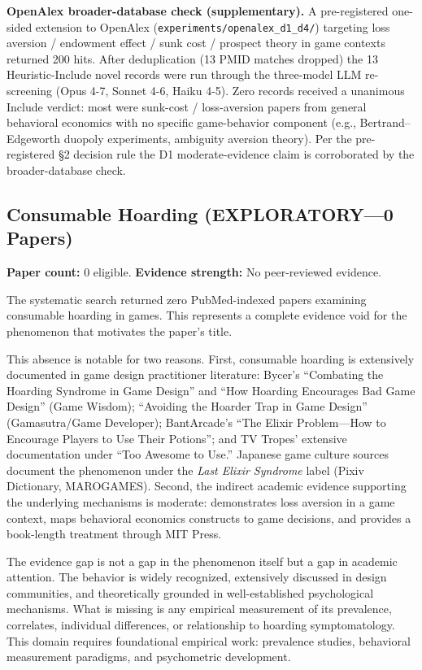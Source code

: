 \documentclass[12pt]{article}
\begin{document}
\textbf{OpenAlex broader-database check (supplementary).} A pre-registered one-sided extension to OpenAlex (\texttt{experiments/openalex\_d1\_d4/}) targeting loss aversion / endowment effect / sunk cost / prospect theory in game contexts returned 200 hits. After deduplication (13 PMID matches dropped) the 13 Heuristic-Include novel records were run through the three-model LLM re-screening (Opus 4-7, Sonnet 4-6, Haiku 4-5). Zero records received a unanimous Include verdict: most were sunk-cost / loss-aversion papers from general behavioral economics with no specific game-behavior component (e.g., Bertrand–Edgeworth duopoly experiments, ambiguity aversion theory). Per the pre-registered §2 decision rule the D1 moderate-evidence claim is corroborated by the broader-database check.

\subsection{Consumable Hoarding (EXPLORATORY---0 Papers)}

\textbf{Paper count:} 0 eligible. \textbf{Evidence strength:} No peer-reviewed evidence.

The systematic search returned zero PubMed-indexed papers examining consumable hoarding in games. This represents a complete evidence void for the phenomenon that motivates the paper's title.

This absence is notable for two reasons. First, consumable hoarding is extensively documented in game design practitioner literature: Bycer's ``Combating the Hoarding Syndrome in Game Design'' and ``How Hoarding Encourages Bad Game Design'' (Game Wisdom); ``Avoiding the Hoarder Trap in Game Design'' (Gamasutra/Game Developer); BantArcade's ``The Elixir Problem---How to Encourage Players to Use Their Potions''; and TV Tropes' extensive documentation under ``Too Awesome to Use.'' Japanese game culture sources document the phenomenon under the \textit{Last Elixir Syndrome} label (Pixiv Dictionary, MAROGAMES). Second, the indirect academic evidence supporting the underlying mechanisms is moderate: \citet{Phillips2020} demonstrates loss aversion in a game context, \citet{Toh2021} maps behavioral economics constructs to game decisions, and \citet{Engelstein2020} provides a book-length treatment through MIT Press.

The evidence gap is not a gap in the phenomenon itself but a gap in academic attention. The behavior is widely recognized, extensively discussed in design communities, and theoretically grounded in well-established psychological mechanisms. What is missing is any empirical measurement of its prevalence, correlates, individual differences, or relationship to hoarding symptomatology. This domain requires foundational empirical work: prevalence studies, behavioral measurement paradigms, and psychometric development.
\end{document}

